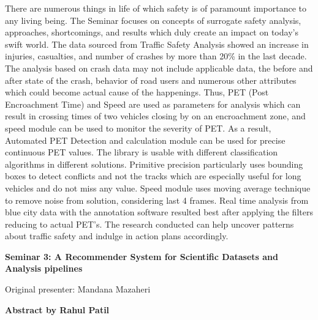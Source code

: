 \documentclass[12pt,letterpaper]{report}
\begin{document}
There are numerous things in life of which safety is of paramount importance to any living being. The Seminar focuses on concepts of surrogate safety analysis, approaches, shortcomings, and results which duly create an impact on today's swift world. The data sourced from Traffic Safety Analysis showed an increase in injuries, casualties, and number of crashes by more than 20\% in the last decade. The analysis based on crash data may not include applicable data, the before and after state of the crash, behavior of road users and numerous other attributes which could become actual cause of the happenings. Thus, PET (Post Encroachment Time) and Speed are used as parameters for analysis which can result in crossing times of two vehicles closing by on an encroachment zone, and speed module can be used to monitor the severity of PET. As a result, Automated PET Detection and calculation module can be used for precise continuous PET values. The library is usable with different classification algorithms in different solutions. Primitive precision particularly uses bounding boxes to detect conflicts and not the tracks which are especially useful for long vehicles and do not miss any value. Speed module uses moving average technique to remove noise from solution, considering last 4 frames. Real time analysis from blue city data with the annotation software resulted best after applying the filters reducing to actual PET's. The research conducted can help uncover patterns about traffic safety and indulge in action plans accordingly. 

\newpage
\begin{center}
    \textbf{Seminar 3: A Recommender System for Scientific Datasets and Analysis pipelines}
        
    \vspace{1em}
    Original presenter: Mandana Mazaheri
       
    \vspace{2em}
    \textbf{Abstract by Rahul Patil}
\end{center}
\end{document}
